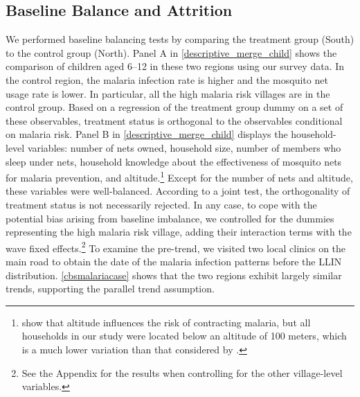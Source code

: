\documentclass[fleqn,11pt]{article}
\begin{document}
\subsection{Baseline Balance and Attrition}

\label{Feb 02 20:20:11 2013}


We performed baseline balancing tests by comparing the treatment group (South) to the control group (North).
Panel A in \autoref{descriptive_merge_child} shows the comparison of children aged 6--12 in these two regions using our survey data. In the control region, the malaria infection rate is higher and the mosquito net usage rate is lower. In particular, all the high malaria risk villages are in the control group. Based on a regression of the treatment group dummy on a set of these observables, treatment status is orthogonal to the observables conditional on malaria risk. Panel B in \autoref{descriptive_merge_child} displays the
household-level variables: number of nets owned, household
size, number of members who sleep under nets, household
knowledge about the effectiveness of mosquito nets for malaria prevention, and
altitude.\footnote{\cite{bodker_relationship_2003} show that altitude influences the risk of contracting malaria, but all households in our
study were located below an altitude of 100 meters, which is a much lower variation than that considered by \cite{bodker_relationship_2003}.} Except for the number
of nets and altitude, these variables were well-balanced. According to a joint test, the orthogonality of treatment status is not necessarily rejected. In any case, to cope with the potential bias arising from baseline imbalance, we controlled for the dummies representing the high malaria risk village, adding their interaction terms with the wave fixed effects.\footnote{See the Appendix for the results when controlling for the other village-level variables.} To examine the pre-trend, we visited two local clinics on the main road to obtain the date of the malaria infection patterns before the LLIN distribution. \autoref{cbsmalariacase} shows that the two regions exhibit largely similar trends, supporting the parallel trend assumption.
\end{document}
